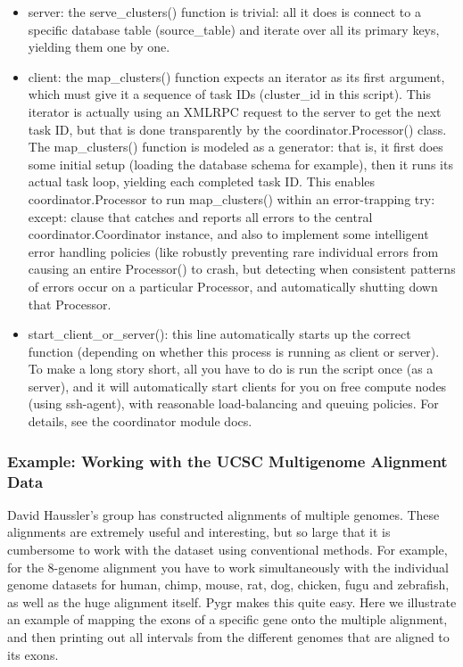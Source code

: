 \documentclass{howto}
\begin{document}
\begin{itemize}

\item
server: the serve_clusters() function is trivial: all it does is connect to a specific database table (source_table) and iterate over all its primary keys, yielding them one by one.

\item    
client: the map_clusters() function expects an iterator as its first argument, which must give it a sequence of task IDs (cluster_id in this script).  This iterator is actually using an XMLRPC request to the server to get the next task ID, but that is done transparently by the coordinator.Processor() class.  The map_clusters() function is modeled as a generator: that is, it first does some initial setup (loading the database schema for example), then it runs its actual task loop, yielding each completed task ID. This enables coordinator.Processor to run map_clusters() within an error-trapping try: except: clause that catches and reports all errors to the central coordinator.Coordinator instance, and also to implement some intelligent error handling policies (like robustly preventing rare individual errors from causing an entire Processor() to crash, but detecting when consistent patterns of errors occur on a particular Processor, and automatically shutting down that Processor.

\item 
start_client_or_server(): this line automatically starts up the correct function (depending on whether this process is running as client or server).  To make a long story short, all you have to do is run the script once (as a server), and it will automatically start clients for you on free compute nodes (using ssh-agent), with reasonable load-balancing and queuing policies.  For details, see the coordinator module docs.
\end{itemize}

\subsubsection{Example: Working with the UCSC Multigenome Alignment Data}

David Haussler's group has constructed alignments of multiple genomes.  These alignments are extremely useful and interesting, but so large that it is cumbersome to work with the dataset using conventional methods.  For example, for the 8-genome alignment you have to work simultaneously with the individual genome datasets for human, chimp, mouse, rat, dog, chicken, fugu and zebrafish, as well as the huge alignment itself.  Pygr makes this quite easy.  Here we illustrate an example of mapping the exons of a specific gene onto the multiple alignment, and then printing out all intervals from the different genomes that are aligned to its exons.
\end{document}
